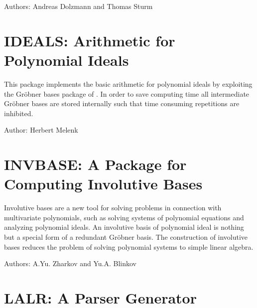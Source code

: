 Authors: Andreas Dolzmann and Thomas Sturm



\newpage

\section{IDEALS: Arithmetic for Polynomial Ideals}

This package implements the basic arithmetic for polynomial ideals by
exploiting the Gr\"obner bases package of \REDUCE.  In order to save
computing time all intermediate Gr\"obner bases are stored internally such
that time consuming repetitions are inhibited.

Author: Herbert Melenk



\newpage

\section{INVBASE: A Package for Computing Involutive Bases}

Involutive bases are a new tool for solving problems in connection with
multivariate polynomials, such as solving systems of polynomial equations
and analyzing polynomial ideals.  An involutive basis of polynomial ideal
is nothing but a special form of a redundant Gr\"obner basis.  The
construction of involutive bases reduces the problem of solving polynomial
systems to simple linear algebra.

Authors: A.Yu. Zharkov and Yu.A. Blinkov



\newpage

\section{LALR: A Parser Generator}

